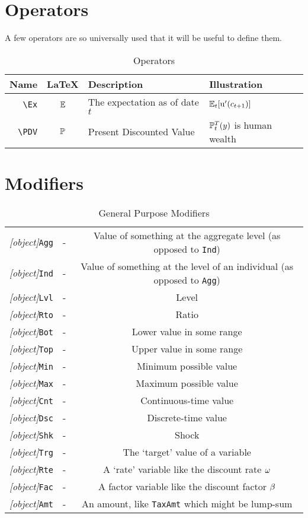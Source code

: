 \documentclass[12pt]{econtex}
\begin{document}
\section{Operators}
A few operators are so universally used that it will be useful to define them.

\begin{table}[h]
	\centering
	\begin{tabular}{|>{\ttfamily}rcll|} 		
		\hline
		 Name    & \LaTeX         & Description & Illustration
  \\ \hline
     \verb|\Ex|        & $\operatorname{\mathbb{E}}$       & The expectation as of date $t$ & $\operatorname{\mathbb{E}}_{t}[{\mathrm{u}}^{\prime}(c_{t+1})]$
\\   \verb|\PDV|        & $\mathbb{P}$       & Present Discounted Value & $\mathbb{P}_{t}^{T}(y)$ is human wealth
  \\	\hline
	\end{tabular}
	\caption{Operators}
	\label{table:Operators}
\end{table}	




\section{Modifiers}
\begin{table}[h]
	\centering
	\begin{tabular}{|>{\ttfamily}ccc|} 		
		\hline
   \textit{[object]}\texttt{Agg} & - & Value of something at the aggregate level (as opposed to \texttt{Ind})
\\ \textit{[object]}\texttt{Ind} & - & Value of something at the level of an individual (as opposed to \texttt{Agg})
\\ \textit{[object]}\texttt{Lvl} & - & Level 
\\ \textit{[object]}\texttt{Rto} & - & Ratio 
\\ \textit{[object]}\texttt{Bot} & - & Lower value in some range 
\\ \textit{[object]}\texttt{Top} & - & Upper value in some range 
\\ \textit{[object]}\texttt{Min} & - & Minimum possible value 
\\ \textit{[object]}\texttt{Max} & - & Maximum possible value 
\\ \textit{[object]}\texttt{Cnt} & - & Continuous-time value
\\ \textit{[object]}\texttt{Dsc} & - & Discrete-time value
\\ \textit{[object]}\texttt{Shk} & - & Shock 
\\ \textit{[object]}\texttt{Trg} & - & The `target' value of a variable 
\\ \textit{[object]}\texttt{Rte} & - & A `rate' variable like the discount rate $\omega$
\\ \textit{[object]}\texttt{Fac} & - & A factor variable like the discount factor $\beta$
\\ \textit{[object]}\texttt{Amt} & - & An amount, like \texttt{TaxAmt} which might be lump-sum
\\ 	\hline
	\end{tabular}
	\caption{General Purpose Modifiers}
	\label{table:General}
\end{table}	
\end{document}
